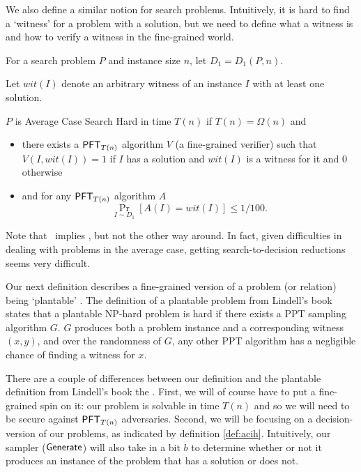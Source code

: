 We also define a similar notion for search problems. Intuitively, it is hard to find a `witness' for a problem with a solution, but we need to define what a witness is and how to verify a witness in the fine-grained world.

\begin{definition}
	\label{def:acsh}
	For a search problem $P$ and instance size $n$, let $D_1 = D_{1}(P,n)$.
	
	Let $wit(I)$ denote an arbitrary witness of an instance $I$ with at least one solution.
	
	$P$ is Average Case Search Hard in time $T(n)$ if $T(n)=\Omega(n)$ and
	\begin{itemize}
		\item there exists a $\mathsf{PFT}_{T(n)}$ algorithm $V$ (a fine-grained verifier) such that $V(I, wit(I)) = 1$ if $I$ has a solution and $wit(I)$ is a witness for it and $0$ otherwise
		\item and for any  $\mathsf{PFT}_{ T(n)}$ algorithm $A$
		\[ \Pr_{I \sim D_1}[A(I) = wit(I)] \le 1/100. \]
	\end{itemize}
\end{definition}

Note that \ACIH~implies \ACSH, but not the other way around. In fact, given difficulties in dealing with problems in the average case, getting search-to-decision reductions seems very difficult.

Our next definition describes a fine-grained version of a problem (or relation) being `plantable' \cite{Lindell}. The definition of a plantable problem from Lindell's book states that a plantable NP-hard problem is hard if there exists a PPT sampling algorithm $G$. $G$ produces both a problem instance and a corresponding witness $(x,y)$, and over the randomness of $G$, any other PPT algorithm has a negligible chance of finding a witness for $x$.

There are a couple of differences between our definition and the plantable definition from Lindell's book the  \cite{Lindell}. First, we will of course have to put a fine-grained spin on it: our problem is solvable in time $T(n)$ and so we will need to be secure against $\mathsf{PFT}_{T(n)}$ adversaries. Second, we will be focusing on a decision-version of our problems, as indicated by definition \ref{def:acih}. Intuitively, our sampler ($\mathsf{Generate}$) will also take in a bit $b$ to determine whether or not it produces an instance of the problem that has a solution or does not.

